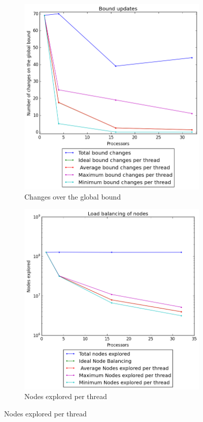 \documentclass[a4paper]{article}
\begin{document}
    \begin{figure}[htp!]
      \centering
      \begin{subfigure}{.5\textwidth}
        \centering
        \includegraphics[width=.99\textwidth]{../2 Analysis/Load/BFS_changes.png}
        \caption{Changes over the global bound}
        \label{fig:changes}
      \end{subfigure}%
      \begin{subfigure}{.5\textwidth}
        \centering
        \includegraphics[width=.99\textwidth]{../2 Analysis/Load/BFS_paths.png}
        \caption{Nodes explored per thread}
        \label{fig:paths}
      \end{subfigure}%


\end{figure}
\end{document}

